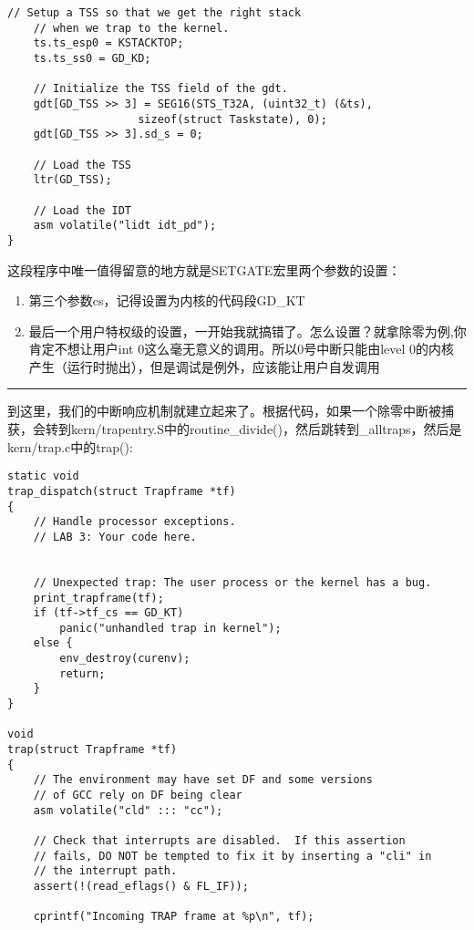 \documentclass{article}
\newcommand{\funcname}[1]{{\ttfamily \small #1}}
\begin{document}
\begin{CJK*}{UTF8}{gkai}
\begin{lstlisting}[style=ccode, title={\scriptsize \ttfamily \bfseries kern/trap.c: idt\_init()}]
	// Setup a TSS so that we get the right stack
	// when we trap to the kernel.
	ts.ts_esp0 = KSTACKTOP;
	ts.ts_ss0 = GD_KD;

	// Initialize the TSS field of the gdt.
	gdt[GD_TSS >> 3] = SEG16(STS_T32A, (uint32_t) (&ts),
					sizeof(struct Taskstate), 0);
	gdt[GD_TSS >> 3].sd_s = 0;

	// Load the TSS
	ltr(GD_TSS);

	// Load the IDT
	asm volatile("lidt idt_pd");
}
\end{lstlisting}

这段程序中唯一值得留意的地方就是SETGATE宏里两个参数的设置：

\begin{enumerate}
\item{第三个参数cs，记得设置为内核的代码段GD\_KT}
\item{最后一个用户特权级的设置，一开始我就搞错了。怎么设置？就拿除零为例,你肯定不想让用户int 0这么毫无意义的调用。所以0号中断只能由level 0的内核产生（运行时抛出），但是调试是例外，应该能让用户自发调用}
\end{enumerate}

\vspace{2em}

\hrule

\vspace{2em}

到这里，我们的中断响应机制就建立起来了。根据代码，如果一个除零中断被捕获，会转到kern/trapentry.S中的\funcname{routine\_divide()}，然后跳转到\funcname{\_alltraps}，然后是kern/trap.c中的\funcname{trap()}:

\begin{lstlisting}[style=ccode, title={\scriptsize \ttfamily \bfseries kern/trap.c}]
static void
trap_dispatch(struct Trapframe *tf)
{
	// Handle processor exceptions.
	// LAB 3: Your code here.
	

	// Unexpected trap: The user process or the kernel has a bug.
	print_trapframe(tf);
	if (tf->tf_cs == GD_KT)
		panic("unhandled trap in kernel");
	else {
		env_destroy(curenv);
		return;
	}
}

void
trap(struct Trapframe *tf)
{
	// The environment may have set DF and some versions
	// of GCC rely on DF being clear
	asm volatile("cld" ::: "cc");

	// Check that interrupts are disabled.  If this assertion
	// fails, DO NOT be tempted to fix it by inserting a "cli" in
	// the interrupt path.
	assert(!(read_eflags() & FL_IF));

	cprintf("Incoming TRAP frame at %p\n", tf);


\end{lstlisting}
\end{CJK*}
\end{document}
